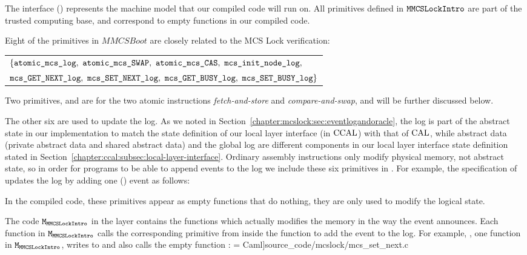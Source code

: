 The interface () represents the machine model that our compiled code will run on.
All primitives defined in ${\mathrm{\texttt{MMCSLockIntro}}}$ are part of the trusted computing base, and correspond to empty functions in our compiled code.

Eight of the primitives in $MMCSBoot$  are closely related to the MCS Lock verification:
\begin{center}
\begin{tabular}{P{0.95\textwidth}}
$\{\codeinmath{atomic\_mcs\_log},\ \codeinmath{atomic\_mcs\_SWAP},\ \codeinmath{atomic\_mcs\_CAS},\ \codeinmath{mcs\_init\_node\_log},$\\
$\codeinmath{mcs\_GET\_NEXT\_log},\ \codeinmath{mcs\_SET\_NEXT\_log},\ \codeinmath{mcs\_GET\_BUSY\_log},\ \codeinmath{mcs\_SET\_BUSY\_log}\} $\\
\end{tabular}
\end{center}

Two primitives,  and  are for the two atomic instructions {\em fetch-and-store} and {\em compare-and-swap}, and will be further discussed below.

The other six are used to update the log.  As we noted in
Section~\ref{chapter:mcslock:sec:eventlogandoracle}, the log is part of the abstract
state in our implementation to match the state definition of our local layer interface (in $\mathrm{CCAL}$) with 
that of $\mathrm{CAL}$, while abstract data (private abstract data and shared abstract data) and the global log are 
different components in our local layer interface state definition stated in Section~\ref{chapter:ccal:subsec:local-layer-interface}.
Ordinary assembly instructions only modify physical memory, not
abstract state, so in order for programs to be able to append events to
the log we include these six primitives in . 
For example, the specification of  updates the log by adding one () event as follows:
 
In the compiled code, these primitives appear as empty functions that do nothing, they are only used to modify the logical state.


The code ${\mathrm{\texttt{M}}}_{{\mathrm{\texttt{MMCSLockIntro}}}}$ in the layer contains the 
functions which actually modifies the memory in the way the event announces.
Each function in ${\mathrm{\texttt{M}}}_{{\mathrm{\texttt{MMCSLockIntro}}}}$ calls the corresponding primitive from
 inside the function to add the event to the log.
For example, , one function in ${\mathrm{\texttt{M}}}_{{\mathrm{\texttt{MMCSLockIntro}}}}$, writes
to  and also calls
the empty function :
 = Caml]{source_code/mcslock/mcs_set_next.c}


